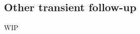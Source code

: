 \begin{colsection}
\begin{colsection}
\end{colsection}


\subsection{Other transient follow-up}
\label{sec:other_followup}
\begin{colsection}

WIP

\end{colsection}


\end{colsection}

